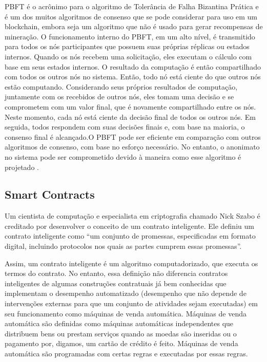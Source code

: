             PBFT é o acrônimo para o algoritmo de Tolerância de Falha Bizantina Prática e é um dos muitos algoritmos de consenso que se pode considerar para uso em um blockchain, embora seja um algoritmo que não é usado para gerar recompensas de mineração. O funcionamento interno do PBFT, em um alto nível, é transmitido para todos os nós participantes que possuem suas próprias réplicas ou estados internos. Quando os nós recebem uma solicitação, eles executam o cálculo com base em seus estados internos. O resultado da computação é então compartilhado com todos os outros nós no sistema. Então, todo nó está ciente do que outros nós estão computando. Considerando seus próprios resultados de computação, juntamente com os recebidos de outros nós, eles tomam uma decisão e se comprometem com um valor final, que é novamente compartilhado entre os nós. Neste momento, cada nó está ciente da decisão final de todos os outros nós. Em seguida, todos respondem com suas decisões finais e, com base na maioria, o consenso final é alcançado.O PBFT pode ser eficiente em comparação com outros algoritmos de consenso, com base no esforço necessário. No entanto, o anonimato no sistema pode ser comprometido devido à maneira como esse algoritmo é projetado \cite{beginnig_blockchain_bikramaditya}.

    
    \subsection{Smart Contracts}
        
        Um cientista de computação e especialista em criptografia chamado Nick Szabo é creditado por desenvolver o conceito de um contrato inteligente. Ele definiu um contrato inteligente como ``um conjunto de promessas, especificadas em formato digital, incluindo protocolos nos quais as partes cumprem essas promessas''. \cite{smart_contracts_szabo}

        Assim, um contrato inteligente é um algoritmo computadorizado, que executa os termos do contrato. No entanto, essa definição não diferencia contratos inteligentes de algumas construções contratuais já bem conhecidas que implementam o desempenho automatizado (desempenho que não depende de intervenções externas para que um conjunto de atividades sejam executadas) em seu funcionamento como máquinas de venda automática. Máquinas de venda automática são definidas como máquinas automáticas independentes que distribuem bens ou prestam serviços quando as moedas são inseridas ou o pagamento por, digamos, um cartão de crédito é feito. Máquinas de venda automática são programadas com certas regras e executadas por essas regras. \cite{blockchain_pratical_guide}
        

